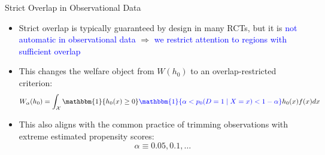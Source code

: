 \documentclass[aspectratio=169,xcolor=dvipsnames]{beamer}
\begin{document}
\begin{frame}{Strict Overlap in Observational Data}
    \begin{itemize}
       \item Strict overlap is typically guaranteed by design in many RCTs, but it is \textcolor{blue}{not automatic in observational data}
        $\Longrightarrow$ \textcolor{blue}{we restrict attention to regions with sufficient overlap}
        \bigskip

        \item This changes the welfare object from $W(h_0)$ to an overlap-restricted criterion:
            \[
               W_\alpha(h_0)
               =
               \int_\mathcal{X} \mathbbm{1}\{h_{0}(x) \geq 0\} 
               \textcolor{blue}{\mathbbm{1}\{\alpha < p_0(D =1 \mid X = x) <  1- \alpha\}}
               h_0(x)f(x)dx
            \]

        \item This also aligns with the common practice of trimming observations with extreme estimated propensity scores:
            \[
            \alpha \equiv 0.05, 0.1,\ldots
            \] 
    \end{itemize}
\end{frame}
\end{document}
